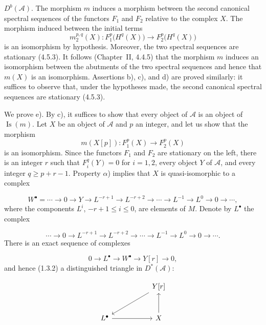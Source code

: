 \clearpage
{}%
\begingroup\small\setlength{\parskip}{0pt}\setlength{\emergencystretch}{1.5em}
\setlength{\abovedisplayskip}{4pt plus 2pt minus 2pt}%
\setlength{\belowdisplayskip}{4pt plus 2pt minus 2pt}%

\noindent $D^b(\mathcal A)$. The morphism $m$ induces a morphism between
the second canonical spectral sequences of the functors $F_1$ and $F_2$
relative to the complex $X$. The morphism induced between the initial terms
\[
m_2^{p,q}(X)\colon F_1^p\bigl(H^q(X)\bigr)
\longrightarrow F_2^p\bigl(H^q(X)\bigr)
\]
is an isomorphism by hypothesis. Moreover, the two spectral sequences are
stationary (4.5.3). It follows (Chapter~II, 4.4.5) that the morphism $m$
induces an isomorphism between the abutments of the two spectral sequences
and hence that $m(X)$ is an isomorphism. Assertions b), c), and d) are
proved similarly: it suffices to observe that, under the hypotheses made,
the second canonical spectral sequences are stationary (4.5.3).

We prove e). By c), it suffices to show that every object of $\mathcal A$
is an object of $\operatorname{Is}(m)$. Let $X$ be an object of
$\mathcal A$ and $p$ an integer, and let us show that the morphism
\[
m(X[p])\colon F_1^p(X)\longrightarrow F_2^p(X)
\]
is an isomorphism. Since the functors $F_1$ and $F_2$ are stationary on the
left, there is an integer $r$ such that $F_i^q(Y)=0$ for $i=1,2$, every
object $Y$ of $\mathcal A$, and every integer $q\geq p+r-1$. Property
$\alpha$) implies that $X$ is quasi-isomorphic to a complex

\[
W^\bullet=
\cdots\longrightarrow0\longrightarrow Y\longrightarrow L^{-r+1}
\longrightarrow L^{-r+2}\longrightarrow\cdots\longrightarrow L^{-1}
\longrightarrow L^0\longrightarrow0\longrightarrow\cdots,
\]
where the components $L^i$, $-r+1\leq i\leq0$, are elements of $M$.
Denote by $L^\bullet$ the complex

\[
\cdots\longrightarrow0\longrightarrow L^{-r+1}
\longrightarrow L^{-r+2}\longrightarrow\cdots\longrightarrow L^{-1}
\longrightarrow L^0\longrightarrow0\longrightarrow\cdots.
\]
There is an exact sequence of complexes

\[
0\longrightarrow L^\bullet\longrightarrow W^\bullet
\longrightarrow Y[r]\longrightarrow0,
\]
and hence (1.3.2) a distinguished triangle in $D^*(\mathcal A)$:

\[
\begin{tikzcd}[column sep=5.2em,row sep=2.8em]
{} & Y[r] \arrow[dl] \\
L^\bullet \arrow[r] & X \arrow[u]
\end{tikzcd}
\]
\endgroup
